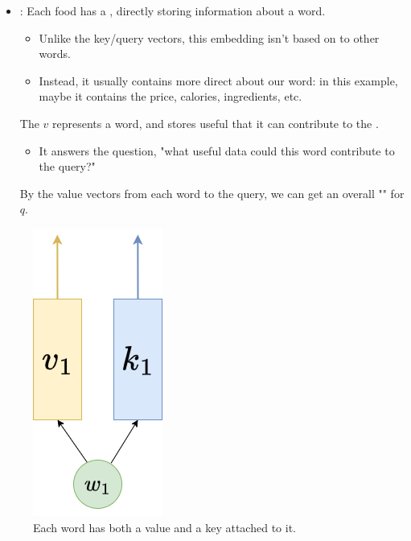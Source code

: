         \begin{itemize}
            \item {}: Each food has a , directly storing information about a word.

            \begin{itemize}
                \item Unlike the key/query vectors, this embedding isn't based on  to other words.

                \item Instead, it usually contains more direct  about our word: in this example, maybe it contains the price, calories, ingredients, etc.
                    \\
            \end{itemize}

            \begin{definition}
                The  $v$ represents a word, and stores useful  that it can contribute to the .

                \begin{itemize}
                    \item It answers the question, "what useful data could this word contribute to the query?"
                \end{itemize}

                By  the value vectors from each word  to the query, we can get an overall "" for $q$.
            \end{definition}
        \end{itemize}

        \begin{figure}[H]
            \centering
            \includegraphics[width=0.1\linewidth]{images/transformers_images/value_key.png}
            \caption*{Each word has both a value and a key attached to it.}
        \end{figure}

